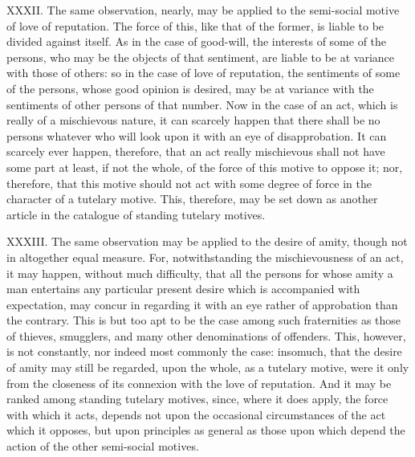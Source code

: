 \documentclass[12pt]{report}
\begin{document}
XXXII. The same observation, nearly, may be applied to the semi-social
motive of love of reputation. The force of this, like that of the
former, is liable to be divided against itself. As in the case of
good-will, the interests of some of the persons, who may be the objects
of that sentiment, are liable to be at variance with those of others: so
in the case of love of reputation, the sentiments of some of the
persons, whose good opinion is desired, may be at variance with the
sentiments of other persons of that number. Now in the case of an act,
which is really of a mischievous nature, it can scarcely happen that
there shall be no persons whatever who will look upon it with an eye of
disapprobation. It can scarcely ever happen, therefore, that an act
really mischievous shall not have some part at least, if not the whole,
of the force of this motive to oppose it; nor, therefore, that this
motive should not act with some degree of force in the character of a
tutelary motive. This, therefore, may be set down as another article in
the catalogue of standing tutelary motives.

XXXIII. The same observation may be applied to the desire of amity,
though not in altogether equal measure. For, notwithstanding the
mischievousness of an act, it may happen, without much difficulty, that
all the persons for whose amity a man entertains any particular present
desire which is accompanied with expectation, may concur in regarding it
with an eye rather of approbation than the contrary. This is but too apt
to be the case among such fraternities as those of thieves, smugglers,
and many other denominations of offenders. This, however, is not
constantly, nor indeed most commonly the case: insomuch, that the desire
of amity may still be regarded, upon the whole, as a tutelary motive,
were it only from the closeness of its connexion with the love of
reputation. And it may be ranked among standing tutelary motives, since,
where it does apply, the force with which it acts, depends not upon the
occasional circumstances of the act which it opposes, but upon
principles as general as those upon which depend the action of the other
semi-social motives.
\end{document}
